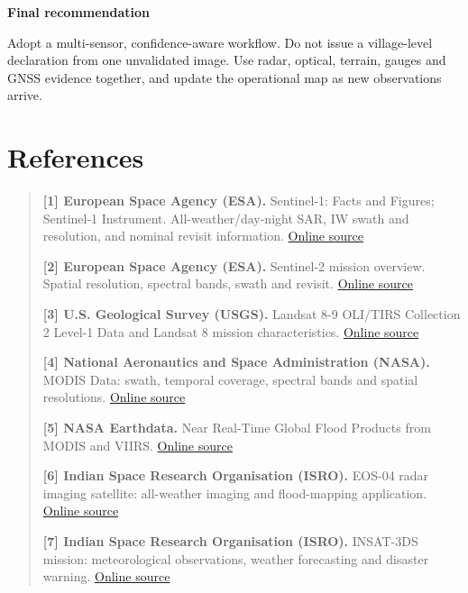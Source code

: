 \documentclass[11pt,a4paper]{article}
\begin{document}
\begin{summarybox}
{\sffamily\bfseries\color{Primary}Final recommendation}\par
Adopt a multi-sensor, confidence-aware workflow. Do not issue a village-level declaration from one unvalidated image. Use radar, optical, terrain, gauges and GNSS evidence together, and update the operational map as new observations arrive.
\end{summarybox}

\section{References}\label{references}

\begin{quote}
\textbf{{[}1{]} European Space Agency (ESA).} Sentinel-1: Facts and Figures; Sentinel-1 Instrument. All-weather/day-night SAR, IW swath and resolution, and nominal revisit information. \href{https://www.esa.int/Applications/Observing_the_Earth/Copernicus/Sentinel-1/Facts_and_figures}{Online source}

\textbf{{[}2{]} European Space Agency (ESA).} Sentinel-2 mission overview. Spatial resolution, spectral bands, swath and revisit. \href{https://www.esa.int/Applications/Observing_the_Earth/Copernicus/Sentinel-2}{Online source}

\textbf{{[}3{]} U.S. Geological Survey (USGS).} Landsat 8-9 OLI/TIRS Collection 2 Level-1 Data and Landsat 8 mission characteristics. \href{https://www.usgs.gov/centers/eros/science/usgs-eros-archive-landsat-archives-landsat-8-9-operational-land-imager-and}{Online source}

\textbf{{[}4{]} National Aeronautics and Space Administration (NASA).} MODIS Data: swath, temporal coverage, spectral bands and spatial resolutions. \href{https://modis.gsfc.nasa.gov/data/}{Online source}

\textbf{{[}5{]} NASA Earthdata.} Near Real-Time Global Flood Products from MODIS and VIIRS. \href{https://www.earthdata.nasa.gov/data/instruments/viirs/near-real-time-data/nrt-global-flood-products}{Online source}

\textbf{{[}6{]} Indian Space Research Organisation (ISRO).} EOS-04 radar imaging satellite: all-weather imaging and flood-mapping application. \href{https://www.isro.gov.in/mission_PSLV_C52_EOS_04.html}{Online source}

\textbf{{[}7{]} Indian Space Research Organisation (ISRO).} INSAT-3DS mission: meteorological observations, weather forecasting and disaster warning. \href{https://www.isro.gov.in/GSLV-F14_INSAT-3DS_mission.html}{Online source}


\end{quote}
\end{document}

